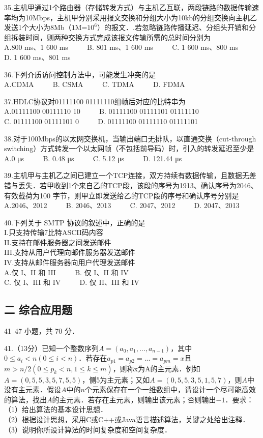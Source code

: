 35.主机甲通过1个路由器（存储转发方式）与主机乙互联，两段链路的数据传输速率均为10Mbps，主机甲分别采用报文交换和分组大小为10kb的分组交换向主机乙发送1个大小为8Mb（$1$M=$10^6$）的报文．.若忽略链路传播延迟、分组头开销和分组拆装时间，则两种交换方式完成该报文传输所需的总时间分别为 \\
A.800 ms、1 600 ms $\qquad$ B. 801 ms、1 600 ms $\qquad$ C. 1 600 ms、800 ms $\qquad$ D. 1 600 ms、801 ms

36.下列介质访问控制方法中，可能发生冲突的是 \\
A.CDMA $\qquad$ B. CSMA $\qquad$ C. TDMA $\qquad$ D. FDMA 

37.HDLC协议对01111100 01111110组帧后对应的比特串为 \\
A.01111100 00111110 10 $\qquad$ B. 01111100 01111101 01111110  \\
C. 01111100 01111101 0 $\qquad$ D. 01111100 01111110 01111101 

38.对于100Mbps的以太网交换机，当输出端口无排队，以直通交换（cut-through switching）方式转发一个以太网帧（不包括前导码）时，引入的转发延迟至少是 \\
A.0 μs $\qquad$ B. 0.48 μs $\qquad$ C. 5.12 μs $\qquad$ D. 121.44 μs

39.主机甲与主机乙之间已建立一个TCP连接，双方持续有数据传输，且数据无差错与丢失．若甲收到1个来自乙的TCP段，该段的序号为1913、确认序号为2046、有效载荷为100 字节，则甲立即发送给乙的TCP段的序号和确认序号分别是 \\
A.2046、2012 $\qquad$ B. 2046、2013 $\qquad$ C. 2047、2012 $\qquad$ D. 2047、2013

40.下列关于 SMTP 协议的叙述中，正确的是 \\
I.只支持传输7比特ASCII码内容 \\
II.支持在邮件服务器之间发送邮件 \\
III.支持从用户代理向邮件服务器发送邮件 \\
IV.支持从邮件服务器向用户代理发送邮件 \\
A.仅 I、II 和 III $\qquad$ B. 仅 I、II 和 IV \\
C. 仅 I、III 和 IV $\qquad$ D. 仅 II、III 和 IV

\subsection{二 综合应用题}
41~47 小题，共 70 分．

41.（13分）已知一个整数序列$A=(a_0, a_1,...,a_{n-1})$，其中$0 \leq a_i<n(0 \leq i < n)$．若存在$a_{p1}=a_{p2}=...=a_{pm}=x$且$m>n/2(0 \leq p_k < n, 1 \leq k \leq m)$，则称x为A的主元素．例如$A=(0,5,5,3,5,7,5,5)$，侧5为主元素；又如$A=(0,5,5,3,5,1,5,7)$，则$A$中没有主元素．假设$A$中的$n$个元素保存在一个一维数组中，请设计一个尽可能高效的算法，找出$A$的主元素．若存在主元素，则输出该元素；否则输出$-1$．要求： \\
（1）给出算法的基本设计思想． \\
（2）根据设计思想，采用C或C++或Java语言描述算法，关键之处给出注释． \\
（3）说明你所设计算法的时间复杂度和空间复杂度．

